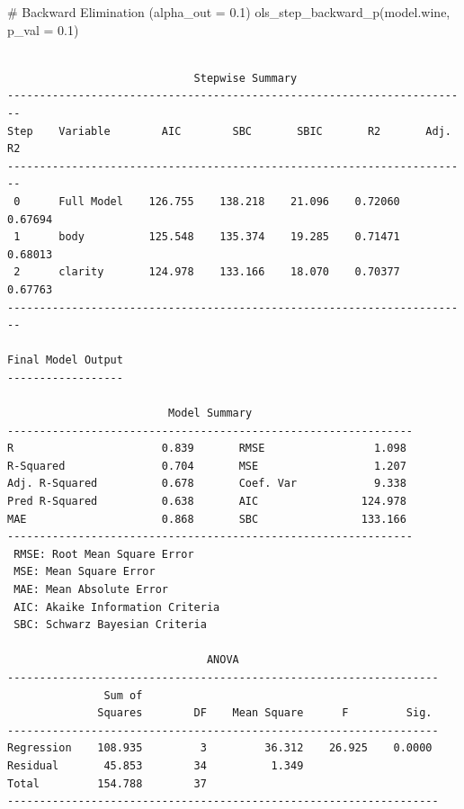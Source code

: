 \documentclass[
  letterpaper,
  DIV=11,
  numbers=noendperiod]{scrreprt}
\newenvironment{Shaded}{\begin{snugshade}}{\end{snugshade}}
\newcommand{\AttributeTok}[1]{\textcolor[rgb]{0.40,0.45,0.13}{#1}}
\newcommand{\CommentTok}[1]{\textcolor[rgb]{0.37,0.37,0.37}{#1}}
\newcommand{\FloatTok}[1]{\textcolor[rgb]{0.68,0.00,0.00}{#1}}
\newcommand{\FunctionTok}[1]{\textcolor[rgb]{0.28,0.35,0.67}{#1}}
\newcommand{\NormalTok}[1]{\textcolor[rgb]{0.00,0.23,0.31}{#1}}
\begin{document}
\begin{Shaded}
\begin{Highlighting}[]
\CommentTok{\# Backward Elimination (alpha\_out = 0.1)}
\FunctionTok{ols\_step\_backward\_p}\NormalTok{(model.wine, }\AttributeTok{p\_val =} \FloatTok{0.1}\NormalTok{)}
\end{Highlighting}
\end{Shaded}

\begin{verbatim}

                             Stepwise Summary                             
------------------------------------------------------------------------
Step    Variable        AIC        SBC       SBIC       R2       Adj. R2 
------------------------------------------------------------------------
 0      Full Model    126.755    138.218    21.096    0.72060    0.67694 
 1      body          125.548    135.374    19.285    0.71471    0.68013 
 2      clarity       124.978    133.166    18.070    0.70377    0.67763 
------------------------------------------------------------------------

Final Model Output 
------------------

                         Model Summary                          
---------------------------------------------------------------
R                       0.839       RMSE                 1.098 
R-Squared               0.704       MSE                  1.207 
Adj. R-Squared          0.678       Coef. Var            9.338 
Pred R-Squared          0.638       AIC                124.978 
MAE                     0.868       SBC                133.166 
---------------------------------------------------------------
 RMSE: Root Mean Square Error 
 MSE: Mean Square Error 
 MAE: Mean Absolute Error 
 AIC: Akaike Information Criteria 
 SBC: Schwarz Bayesian Criteria 

                               ANOVA                                
-------------------------------------------------------------------
               Sum of                                              
              Squares        DF    Mean Square      F         Sig. 
-------------------------------------------------------------------
Regression    108.935         3         36.312    26.925    0.0000 
Residual       45.853        34          1.349                     
Total         154.788        37                                    
-------------------------------------------------------------------


\end{verbatim}
\end{document}
